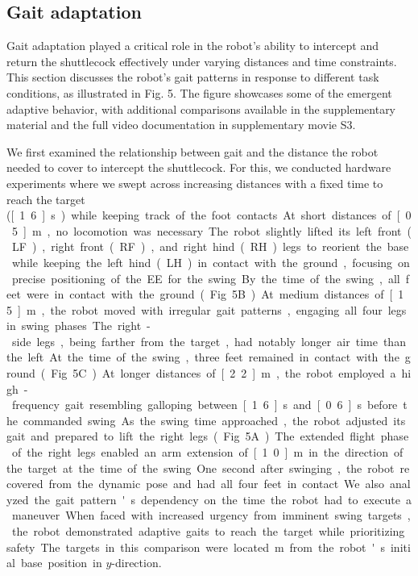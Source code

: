 \documentclass[9pt,twocolumn,twoside]{osajnl}
\begin{document}
\subsection*{Gait adaptation}
Gait adaptation played a critical role in the robot's ability to intercept and return the shuttlecock effectively under varying distances and time constraints. This section discusses the robot's gait patterns in response to different task conditions, as illustrated in Fig. 5. The figure showcases some of the emergent adaptive behavior, with additional comparisons available in the supplementary material and the full video documentation in supplementary movie S3.

We first examined the relationship between gait and the distance the robot needed to cover to intercept the shuttlecock. For this, we conducted hardware experiments where we swept across increasing distances with a fixed time to reach the target (\unit[1.6]{s}) while keeping track of the foot contacts.

At short distances of \unit[0.5]{m}, no locomotion was necessary. The robot slightly lifted its left front (LF), right front (RF), and right hind (RH) legs to reorient the base while keeping the left hind (LH) in contact with the ground, focusing on precise positioning of the \ac{EE} for the swing. By the time of the swing, all feet were in contact with the ground (Fig. 5B).

At medium distances of \unit[1.5]{m}, the robot moved with irregular gait patterns, engaging all four legs in swing phases. The right-side legs, being farther from the target, had notably longer air time than the left. At the time of the swing, three feet remained in contact with the ground (Fig. 5C).

At longer distances of \unit[2.2]{m}, the robot employed a high-frequency gait resembling galloping between \unit[1.6]{s} and \unit[0.6]{s} before the commanded swing. As the swing time approached, the robot adjusted its gait and prepared to lift the right legs (Fig. 5A). The extended flight phase of the right legs enabled an arm extension of \unit[1.0]{m} in the direction of the target at the time of the swing. One second after swinging, the robot recovered from the dynamic pose and had all four feet in contact.

We also analyzed the gait pattern's dependency on the time the robot had to execute a maneuver. When faced with increased urgency from imminent swing targets, the robot demonstrated adaptive gaits to reach the target while prioritizing safety. The targets in this comparison were located \unit[2]{m} from the robot's initial base position in $y$-direction.
\end{document}
